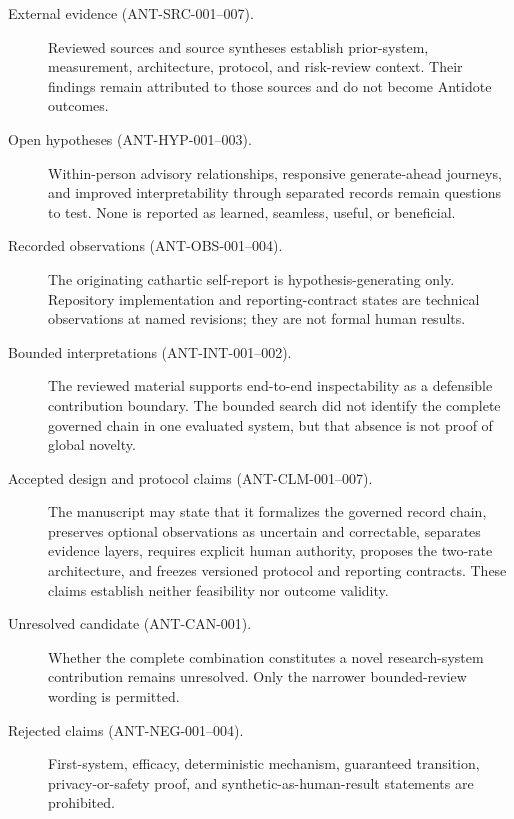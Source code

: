 \begin{description}
  \item[External evidence (ANT-SRC-001--007).] Reviewed sources and source
    syntheses establish prior-system, measurement, architecture, protocol, and
    risk-review context. Their findings remain attributed to those sources and
    do not become Antidote outcomes.

  \item[Open hypotheses (ANT-HYP-001--003).] Within-person advisory
    relationships, responsive generate-ahead journeys, and improved
    interpretability through separated records remain questions to test. None
    is reported as learned, seamless, useful, or beneficial.

  \item[Recorded observations (ANT-OBS-001--004).] The originating cathartic
    self-report is hypothesis-generating only. Repository implementation and
    reporting-contract states are technical observations at named revisions;
    they are not formal human results.

  \item[Bounded interpretations (ANT-INT-001--002).] The reviewed material
    supports end-to-end inspectability as a defensible contribution boundary.
    The bounded search did not identify the complete governed chain in one
    evaluated system, but that absence is not proof of global novelty.

  \item[Accepted design and protocol claims (ANT-CLM-001--007).] The manuscript
    may state that it formalizes the governed record chain, preserves optional
    observations as uncertain and correctable, separates evidence layers,
    requires explicit human authority, proposes the two-rate architecture, and
    freezes versioned protocol and reporting contracts. These claims establish
    neither feasibility nor outcome validity.

  \item[Unresolved candidate (ANT-CAN-001).] Whether the complete combination
    constitutes a novel research-system contribution remains unresolved. Only
    the narrower bounded-review wording is permitted.

  \item[Rejected claims (ANT-NEG-001--004).] First-system, efficacy,
    deterministic mechanism, guaranteed transition, privacy-or-safety proof,
    and synthetic-as-human-result statements are prohibited.
\end{description}

